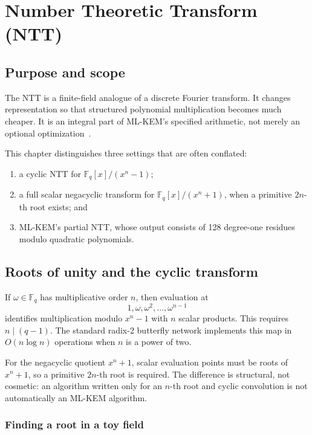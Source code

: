 \chapter{Number Theoretic Transform (NTT)}
\label{ch:ntt}

\section{Purpose and scope}

The NTT is a finite-field analogue of a discrete Fourier transform. It changes representation so that structured polynomial multiplication becomes much cheaper. It is an integral part of ML-KEM's specified arithmetic, not merely an optional optimization~\cite{fips203}.

This chapter distinguishes three settings that are often conflated:
\begin{enumerate}
  \item a cyclic NTT for $\mathbb{F}_q[x]/(x^n-1)$;
  \item a full scalar negacyclic transform for $\mathbb{F}_q[x]/(x^n+1)$, when a primitive $2n$-th root exists; and
  \item ML-KEM's partial NTT, whose output consists of 128 degree-one residues modulo quadratic polynomials.
\end{enumerate}

\section{Roots of unity and the cyclic transform}

If $\omega\in\mathbb{F}_q$ has multiplicative order $n$, then evaluation at
\[
1,\omega,\omega^2,\ldots,\omega^{n-1}
\]
identifies multiplication modulo $x^n-1$ with $n$ scalar products. This requires $n\mid(q-1)$. The standard radix-2 butterfly network implements this map in $O(n\log n)$ operations when $n$ is a power of two.

For the negacyclic quotient $x^n+1$, scalar evaluation points must be roots of $x^n+1$, so a primitive $2n$-th root is required. The difference is structural, not cosmetic: an algorithm written only for an $n$-th root and cyclic convolution is not automatically an ML-KEM algorithm.

\subsection{Finding a root in a toy field}

